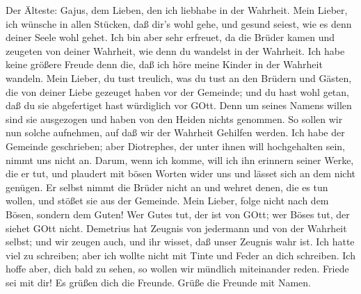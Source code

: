  Der Älteste: Gajus, dem Lieben, den ich liebhabe in der
Wahrheit.  Mein Lieber, ich wünsche in allen Stücken, daß
dir's wohl gehe, und gesund seiest, wie es denn deiner Seele wohl gehet.
 Ich bin aber sehr erfreuet, da die Brüder kamen und
zeugeten von deiner Wahrheit, wie denn du wandelst in der Wahrheit.
 Ich habe keine größere Freude denn die, daß ich höre meine
Kinder in der Wahrheit wandeln.  Mein Lieber, du tust
treulich, was du tust an den Brüdern und Gästen,  die von
deiner Liebe gezeuget haben vor der Gemeinde; und du hast wohl getan,
daß du sie abgefertiget hast würdiglich vor GOtt.  Denn um
seines Namens willen sind sie ausgezogen und haben von den Heiden nichts
genommen.  So sollen wir nun solche aufnehmen, auf daß wir
der Wahrheit Gehilfen werden.  Ich habe der Gemeinde
geschrieben; aber Diotrephes, der unter ihnen will hochgehalten sein,
nimmt uns nicht an.  Darum, wenn ich komme, will ich ihn
erinnern seiner Werke, die er tut, und plaudert mit bösen Worten wider
uns und lässet sich an dem nicht genügen. Er selbst nimmt die Brüder
nicht an und wehret denen, die es tun wollen, und stößet sie aus der
Gemeinde.  Mein Lieber, folge nicht nach dem Bösen, sondern
dem Guten! Wer Gutes tut, der ist von GOtt; wer Böses tut, der siehet
GOtt nicht.  Demetrius hat Zeugnis von jedermann und von
der Wahrheit selbst; und wir zeugen auch, und ihr wisset, daß unser
Zeugnis wahr ist.  Ich hatte viel zu schreiben; aber ich
wollte nicht mit Tinte und Feder an dich schreiben.  Ich
hoffe aber, dich bald zu sehen, so wollen wir mündlich miteinander
reden.  Friede sei mit dir! Es grüßen dich die Freunde.
Grüße die Freunde mit Namen.
